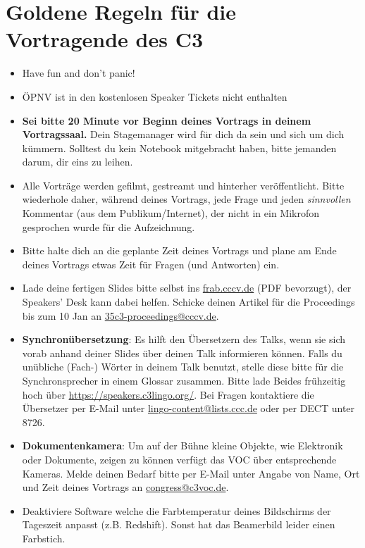 \documentclass[paper=a4]{scrartcl}
\begin{document}
\section*{Goldene Regeln für die Vortragende des C3}
\begin{itemize}
	\item Have fun and don't panic!
	\item ÖPNV ist in den kostenlosen Speaker Tickets nicht enthalten
	\item \textbf{Sei bitte 20 Minute vor Beginn deines Vortrags in deinem Vortragssaal.} Dein Stagemanager wird für dich da sein und sich um dich kümmern. Solltest du kein Notebook mitgebracht haben, bitte jemanden darum, dir eins zu leihen.
	\item Alle Vorträge werden gefilmt, gestreamt und hinterher veröffentlicht. Bitte wiederhole daher, während deines Vortrags, jede Frage und jeden \textit{sinnvollen} Kommentar (aus dem Publikum/Internet), der nicht in ein Mikrofon gesprochen wurde für die Aufzeichnung.
	\item Bitte halte dich an die geplante Zeit deines Vortrags und plane am Ende deines Vortrags etwas Zeit für Fragen (und Antworten) ein.
	\item Lade deine fertigen Slides bitte selbst ins \url{frab.cccv.de} (PDF bevorzugt), der Speakers' Desk kann dabei helfen. Schicke deinen Artikel für die Proceedings bis zum 10 Jan an \url{35c3-proceedings@cccv.de}.
	\item \textbf{Synchronübersetzung}: Es hilft den Übersetzern des Talks, wenn sie sich vorab anhand deiner Slides über deinen Talk informieren können. Falls du unübliche (Fach-\nobreak) Wörter in deinem Talk benutzt, stelle diese bitte für die Synchronsprecher in einem Glossar zusammen. Bitte lade Beides frühzeitig hoch über \url{https://speakers.c3lingo.org/}. Bei Fragen kontaktiere die Übersetzer per E-Mail unter \url{lingo-content@lists.ccc.de} oder per DECT unter 8726.
	\item \textbf{Dokumentenkamera}: Um auf der Bühne kleine Objekte, wie Elektronik oder Dokumente, zeigen zu können verfügt das VOC über entsprechende Kameras. Melde deinen Bedarf bitte per E-Mail unter Angabe von Name, Ort und Zeit deines Vortrags an \url{congress@c3voc.de}.
	\item Deaktiviere Software welche die Farbtemperatur deines Bildschirms der Tageszeit anpasst (z.B. Redshift). Sonst hat das Beamerbild leider einen Farbstich.
\end{itemize}
\end{document}
